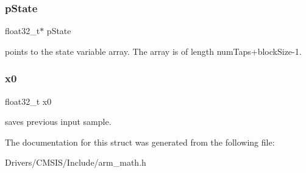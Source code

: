 \subsubsection{\texorpdfstring{p\+State}{pState}}
{\footnotesize\ttfamily float32\+\_\+t$\ast$ p\+State}

points to the state variable array. The array is of length num\+Taps+block\+Size-\/1. \mbox{\label{structarm__lms__norm__instance__f32_ab56b6f83c5b324c3ef620474b6e5a6e1}} 
\subsubsection{\texorpdfstring{x0}{x0}}
{\footnotesize\ttfamily float32\+\_\+t x0}

saves previous input sample. 

The documentation for this struct was generated from the following file\+:\begin{DoxyCompactItemize}
\item 
Drivers/\+C\+M\+S\+I\+S/\+Include/arm\+\_\+math.\+h\end{DoxyCompactItemize}
